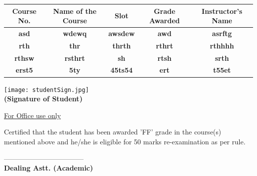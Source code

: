 \documentclass[12pt]{article}
\begin{document}
\begingroup
\setlength{\tabcolsep}{8pt} %
\renewcommand{\arraystretch}{1.5} %
\begin{table}[ht]
    \centering
    \begin{tabular}{|c|c|c|c|c|}
    \hline
         \textbf{Course No.} & \textbf{Name of the Course}& \textbf{Slot} &\textbf{Grade Awarded} & \textbf{Instructor's Name}  \\
         \hline
         \textbf{asd}&\textbf{wdewq} &\textbf{awsdew} &\textbf{awd} &\textbf{asrftg} \\
         \hline
         \textbf{rth}&\textbf{thr} &\textbf{thrth} &\textbf{rthrt} &\textbf{rthhhh}\\
         \hline
         \textbf{rthsw}&\textbf{rsthrt} &\textbf{sh} &\textbf{rtsh} &\textbf{srth}\\
         \hline
         \textbf{erst5}&\textbf{5ty} &\textbf{45ts54} &\textbf{ert} &\textbf{t55et}\\
    \hline
    \end{tabular}
    \label{tab:my_label}
\end{table}
\endgrou
\begin{flushright}
     \vspace{0.5cm}
    \texttt{[image: studentSign.jpg]}\\
\textbf{(Signature of Student)} 
\end{flushright}

\hline
\begin{center}
    \underline{For Office use only}
\end{center}

Certified that the student has been awarded 'FF' grade in the course(s) mentioned
above and he/she is eligible for 50 marks re-examination as per rule. 

\vspace{1cm}
\begin{flushright}
    -----------------------------------\\
   \textbf{Dealing Astt. (Academic)} 
\end{flushright}
\end{document}
